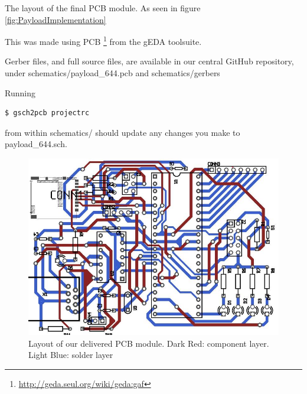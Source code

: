 \label{appendix-layout}

The layout of the final PCB module. As seen in figure \ref{fig:PayloadImplementation} 

This was made using PCB \footnote{\url{http://geda.seul.org/wiki/geda:gaf}} from the gEDA toolsuite.

Gerber files, and full source files, are available in our central GitHub 
\cite{github} repository, under schematics/payload\_644.pcb and schematics/gerbers

Running
\begin{verbatim} 
$ gsch2pcb projectrc
\end{verbatim}
from within schematics/ should update any changes you make to payload\_644.sch.

\begin{figure}[H]
\includegraphics[width=1.4\textwidth, angle=90]{schematics/payload_644_layout.jpg}
\caption{Layout of our delivered PCB module. Dark Red: component layer. Light Blue: solder layer}
\end{figure}
